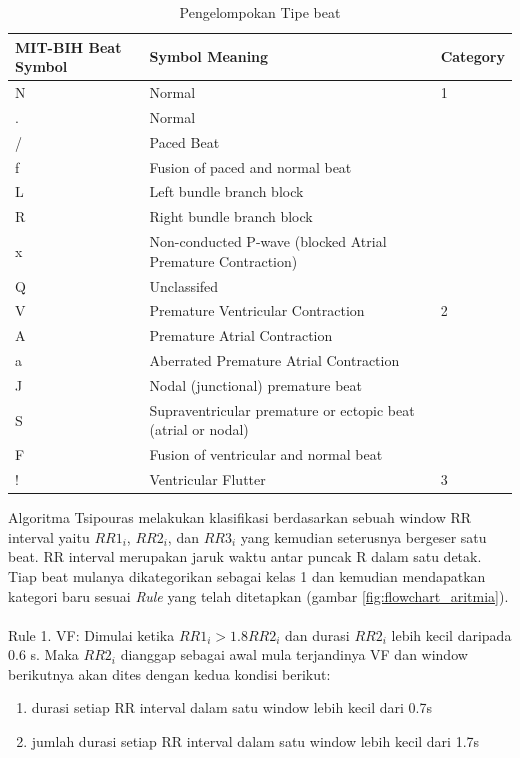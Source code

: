 \begin{table}[htbp]
\centering
	\begin{tabular}{|L{2cm}|L{7cm}|C{2cm}|}
	\hline
	\textbf{MIT-BIH Beat Symbol} & \textbf{Symbol Meaning} & 	\textbf{Category} \\
	\hline
	N & Normal & 1 \\
	. & Normal &  \\
	/ & Paced Beat & \\ 
	f & Fusion of paced and normal beat & \\
	L & Left bundle branch block & \\ 
	R & Right bundle branch block & \\ 
	x & Non-conducted P-wave (blocked Atrial Premature Contraction) & \\
	Q & Unclassifed & \\
	\hline
	V & Premature Ventricular Contraction & 2 \\
	A & Premature Atrial Contraction & \\
	a & Aberrated Premature Atrial Contraction & \\
	J & Nodal (junctional) premature beat & \\
	S & Supraventricular premature or ectopic beat (atrial or nodal) & \\
	F & Fusion of ventricular and normal beat & \\	
	\hline
	! & Ventricular Flutter & 3 \\
	\hline
	\end{tabular}
	\caption{Pengelompokan Tipe beat}
	\label{table:beat_classification}
\end{table}

Algoritma Tsipouras melakukan klasifikasi berdasarkan sebuah window RR interval yaitu $RR1_i$, $RR2_i$, dan $RR3_i$ yang kemudian seterusnya bergeser satu beat. RR interval merupakan jaruk waktu antar puncak R dalam satu detak. Tiap beat mulanya dikategorikan sebagai kelas 1 dan kemudian mendapatkan kategori baru sesuai \textit{Rule} yang telah ditetapkan (gambar \ref{fig:flowchart_aritmia}).
\\
\\
Rule 1. VF: Dimulai ketika $RR1_i > 1.8RR2_i$ dan durasi $RR2_i$ lebih kecil daripada 0.6 s. Maka $RR2_i$ dianggap sebagai awal mula terjandinya VF dan window berikutnya akan dites dengan kedua kondisi berikut:

\begin{enumerate}
	\item durasi setiap RR interval dalam satu window lebih kecil dari 0.7s
	\item jumlah durasi setiap RR interval dalam satu window lebih kecil dari 1.7s
\end{enumerate}

